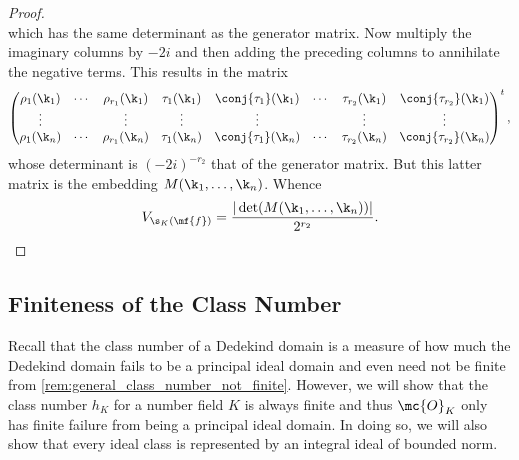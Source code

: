 \documentclass[12pt]{article}
\begin{document}
\begin{proof}
\[        \]
        which has the same determinant as the generator matrix. Now multiply the imaginary columns by \(-2i\) and then adding the preceding columns to annihilate the negative terms. This results in the matrix
        \[
          \begin{pmatrix} \rho_{1}(\k_{1}) & \cdots & \rho_{r_{1}}(\k_{1}) & \tau_{1}(\k_{1}) &\conj{\tau_{1}}(\k_{1}) & \cdots & \tau_{r_{2}}(\k_{1}) & \conj{\tau_{r_{2}}}(\k_{1}) \\ \vdots & & \vdots & \vdots & \vdots & & \vdots & \vdots \\ \rho_{1}(\k_{n}) & \cdots & \rho_{r_{1}}(\k_{n}) & \tau_{1}(\k_{n}) & \conj{\tau_{1}}(\k_{n}) & \cdots & \tau_{r_{2}}(\k_{n}) & \conj{\tau_{r_{2}}}(\k_{n}) \end{pmatrix}^{t},
        \]
        whose determinant is \((-2i)^{-r_{2}}\) that of the generator matrix. But this latter matrix is the embedding \(M(\k_{1},\ldots,\k_{n})\). Whence
        \[
          V_{\s_{K}(\mf{f})} = \frac{|\det(M(\k_{1},\ldots,\k_{n}))|}{2^{r_{2}}}.
        \]
      \end{proof}
    \subsection{Finiteness of the Class Number}
      Recall that the class number of a Dedekind domain is a measure of how much the Dedekind domain fails to be a principal ideal domain and even need not be finite from \cref{rem:general_class_number_not_finite}. However, we will show that the class number \(h_{K}\) for a number field \(K\) is always finite and thus \(\mc{O}_{K}\) only has finite failure from being a principal ideal domain. In doing so, we will also show that every ideal class is represented by an integral ideal of bounded norm.
\end{document}
